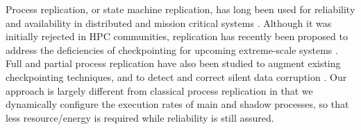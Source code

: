 Process replication, or state machine replication, has long been used for reliability and availability in distributed and mission critical systems \cite{schneider_1990_tutorial,Sousa2005,5470865}. %
Although it was initially rejected in HPC communities, 
replication has recently been proposed to address the deficiencies of checkpointing for upcoming extreme-scale systems \cite{Cappello:09:Fault,engelmann2011redundant}. 
Full and partial
process replication have also been studied to augment existing checkpointing techniques, and to  
detect and correct silent data corruption \cite{stearly_2012_partial,elliott_2012_cpr,ferreira_sc_2011,fiala_2012_sdc}. %
Our approach is largely different from classical process replication in that we dynamically configure the execution rates of main and shadow processes, so that less resource/energy is required while reliability is still assured.  


